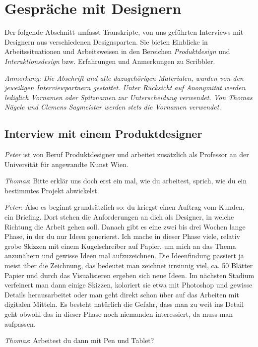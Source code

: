 \chapter{Gespr{\"a}che mit Designern}
Der folgende Abschnitt umfasst Transkripte, von uns geführten Interviews mit Designern aus verschiedenen Designsparten. Sie bieten Einblicke in Arbeitssituationen und Arbeitsweisen in den Bereichen \emph{Produktdesign} und \emph{Interaktionsdesign} bzw. Erfahrungen und Anmerkungen zu Scribbler.

\medskip \emph{Anmerkung: Die Abschrift und alle dazugehörigen Materialen, wurden von den jeweiligen Interviewpartnern gestattet. Unter Rücksicht auf Anonymität werden lediglich Vornamen oder Spitznamen zur Unterscheidung verwendet. Von Thomas Nägele und Clemens Sagmeister werden stets die Vornamen verwendet.}

\section{Interview mit einem Produktdesigner}
\emph{Peter} ist von Beruf Produktdesigner und arbeitet zusätzlich als Professor an der Universität für angewandte Kunst Wien. 

\medskip \emph{Thomas}: Bitte erklär uns doch erst ein mal, wie du arbeitest, sprich, wie du ein bestimmtes Projekt abwickelst.

\medskip \emph{Peter}: Also es beginnt grundsätzlich so: du kriegst einen Auftrag vom Kunden, ein Briefing. Dort stehen die Anforderungen an dich als Designer, in welche Richtung die Arbeit gehen soll. Danach gibt es eine zwei bis drei Wochen lange Phase, in der du nur Ideen generierst. Ich mache in dieser Phase viele, relativ grobe Skizzen mit einem Kugelschreiber auf Papier, um mich an das Thema anzunähern und gewisse Ideen mal aufzuzeichnen. Die Ideenfindung passiert ja meist über die Zeichnung, das bedeutet man zeichnet irrsinnig viel, ca. 50 Blätter Papier und durch das Visualisieren ergeben sich neue Ideen. Im nächsten Stadium verfeinert man dann einige Skizzen, koloriert sie etwa mit Photoshop und gewisse Details herausarbeitet oder man geht direkt schon über auf das Arbeiten mit digitalen Mitteln. Es besteht natürlich die Gefahr, dass man zu weit ins Detail geht obwohl das in dieser Phase noch niemanden interessiert, da muss man aufpassen. 

\medskip \emph{Thomas}: Arbeitest du dann mit Pen und Tablet?

